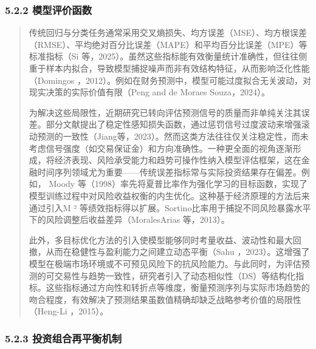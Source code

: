 \subsubsection{5.2.2
模型评价函数}

\begin{quote}
传统回归与分类任务通常采用交叉熵损失、均方误差（MSE）、均方根误差（RMSE）、平均绝对百分比误差（MAPE）和平均百分比误差（MPE）等标准指标（Si
等，2025）。虽然这些指标能有效衡量统计准确性，但往往侧重于样本内拟合，导致模型捕捉噪声而非有效结构特征，从而影响泛化性能（Domingos
，2012）。例如在财务预测中，模型可能过度拟合无关波动，对现实决策的实际价值有限（Peng
and de Moraes Souza，2024）。

为解决这些局限性，近期研究已转向评估预测信号的质量而非单纯关注其误差。部分文献提出了稳定性感知损失函数，通过惩罚信号过度波动来增强滚动预测的一致性（Jiang等，2023）。然而这类方法往往仅关注稳定性，而未考虑信号强度（如交易保证金）和方向准确性。一种更全面的视角逐渐形成，将经济表现、风险承受能力和趋势可操作性纳入模型评估框架，这在金融时间序列领域尤为重要------传统误差指标常与实际投资结果存在偏差。例如，
Moody
等（1998）率先将夏普比率作为强化学习的目标函数，实现了模型训练过程中对风险收益权衡的内生优化。这种基于经济原理的方法后来通过引入M
²
等绩效指标得以扩展。Sortino比率用于捕捉不同风险暴露水平下的风险调整后收益差异（MoralesArias
等，2013）。

此外，多目标优化方法的引入使模型能够同时考量收益、波动性和最大回撤，从而在稳健性与盈利能力之间建立动态平衡（Sahu
，2023）。这增强了模型在极端市场环境或不可预见风险下的抗风险能力。与此同时，为评估预测的可交易性与趋势一致性，研究者引入了动态相似性（DS）等结构化指标。这些指标通过方向性和转折点等维度，衡量预测序列与实际市场趋势的吻合程度，有效解决了预测结果虽数值精确却缺乏战略参考价值的局限性（Heng-Li
，2015）。
\end{quote}

\subsubsection{5.2.3
投资组合再平衡机制}

